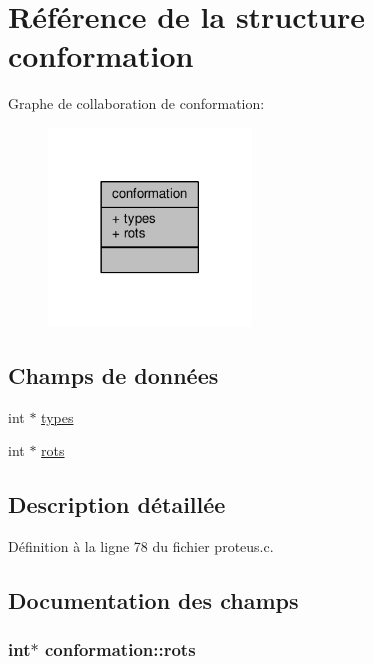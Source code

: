 \hypertarget{structconformation}{\section{Référence de la structure conformation}
\label{structconformation}
}


Graphe de collaboration de conformation\+:\nopagebreak
\begin{figure}[H]
\begin{center}
\leavevmode
\includegraphics[width=153pt]{structconformation__coll__graph}
\end{center}
\end{figure}
\subsection*{Champs de données}
\begin{DoxyCompactItemize}
\item 
int $\ast$ \hyperlink{structconformation_a8e95e9777f616fffa55446ec61fbb589}{types}
\item 
int $\ast$ \hyperlink{structconformation_a466ccf74b88184d93dad626b183cc7aa}{rots}
\end{DoxyCompactItemize}


\subsection{Description détaillée}


Définition à la ligne 78 du fichier proteus.\+c.



\subsection{Documentation des champs}
\hypertarget{structconformation_a466ccf74b88184d93dad626b183cc7aa}{
\subsubsection[{rots}]{\setlength{\rightskip}{0pt plus 5cm}int$\ast$ conformation\+::rots}}\label{structconformation_a466ccf74b88184d93dad626b183cc7aa}


